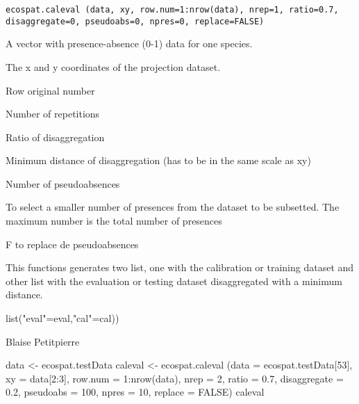 \documentclass[a4paper]{book}
\begin{document}
%
\begin{Usage}
\begin{verbatim}
ecospat.caleval (data, xy, row.num=1:nrow(data), nrep=1, ratio=0.7, 
disaggregate=0, pseudoabs=0, npres=0, replace=FALSE)
\end{verbatim}
\end{Usage}
%
\begin{Arguments}
\begin{ldescription}
\item[\code{data}] A vector with presence-absence (0-1) data for one species.
\item[\code{xy}] The x and y coordinates of the projection dataset.
\item[\code{row.num}] Row original number
\item[\code{nrep}] Number of repetitions
\item[\code{ratio}] Ratio of disaggregation
\item[\code{disaggregate}] Minimum distance of disaggregation (has to be in the same scale as xy)
\item[\code{pseudoabs}] Number of pseudoabsences
\item[\code{npres}] To select a smaller number of presences from the dataset to be subsetted. The maximum number is the total number of presences
\item[\code{replace}] F to replace de pseudoabsences
\end{ldescription}
\end{Arguments}
%
\begin{Details}\relax
This functions generates two list, one with the calibration or training dataset and other list with the evaluation or testing dataset disaggregated with a minimum distance.
\end{Details}
%
\begin{Value}
list("eval"=eval,"cal"=cal))
\end{Value}
%
\begin{Author}\relax
Blaise Petitpierre 
\end{Author}
%
\begin{Examples}
\begin{ExampleCode}
data <- ecospat.testData
caleval <- ecospat.caleval (data = ecospat.testData[53], xy = data[2:3], row.num = 1:nrow(data), 
nrep = 2, ratio = 0.7, disaggregate = 0.2, pseudoabs = 100, npres = 10, replace = FALSE)
caleval
\end{ExampleCode}
\end{Examples}
\end{document}
